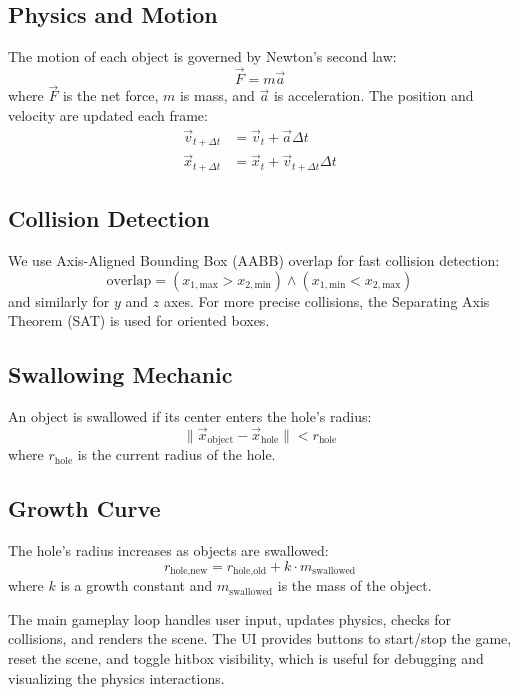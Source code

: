 \documentclass[a4paper, 10 pt]{article}
\begin{document}
\subsection*{Physics and Motion}
The motion of each object is governed by Newton's second law:
\begin{equation}
    \vec{F} = m \vec{a}
\end{equation}
where $\vec{F}$ is the net force, $m$ is mass, and $\vec{a}$ is acceleration. The position and velocity are updated each frame:
\begin{align}
    \vec{v}_{t+\Delta t} &= \vec{v}_t + \vec{a} \Delta t \\
    \vec{x}_{t+\Delta t} &= \vec{x}_t + \vec{v}_{t+\Delta t} \Delta t
\end{align}

\subsection*{Collision Detection}
We use Axis-Aligned Bounding Box (AABB) overlap for fast collision detection:
\begin{equation}
    \text{overlap} = (x_{1,\text{max}} > x_{2,\text{min}}) \land (x_{1,\text{min}} < x_{2,\text{max}})
\end{equation}
and similarly for $y$ and $z$ axes. For more precise collisions, the Separating Axis Theorem (SAT) is used for oriented boxes.

\subsection*{Swallowing Mechanic}
An object is swallowed if its center enters the hole's radius:
\begin{equation}
    \|\vec{x}_{\text{object}} - \vec{x}_{\text{hole}}\| < r_{\text{hole}}
\end{equation}
where $r_{\text{hole}}$ is the current radius of the hole.

\subsection*{Growth Curve}
The hole's radius increases as objects are swallowed:
\begin{equation}
    r_{\text{hole,new}} = r_{\text{hole,old}} + k \cdot m_{\text{swallowed}}
\end{equation}
where $k$ is a growth constant and $m_{\text{swallowed}}$ is the mass of the object.

The main gameplay loop handles user input, updates physics, checks for collisions, and renders the scene. The UI provides buttons to start/stop the game, reset the scene, and toggle hitbox visibility, which is useful for debugging and visualizing the physics interactions.
\end{document}
